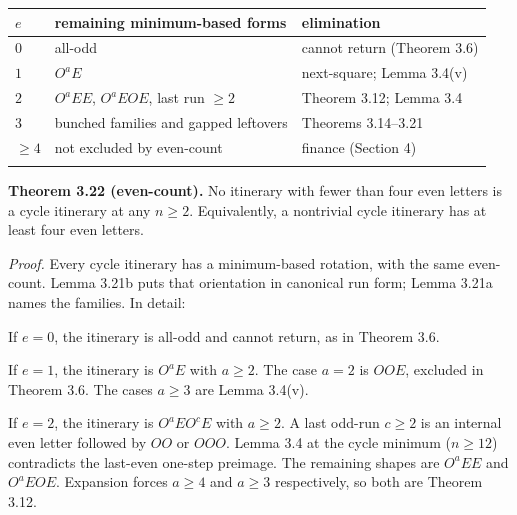 \documentclass[12pt]{article}
\begin{document}
\begin{longtable}[]{@{}
  >{\raggedleft\arraybackslash}p{}
  >{\raggedright\arraybackslash}p{}
  >{\raggedright\arraybackslash}p{}@{}}
\toprule\noalign{}
\begin{minipage}[b]{\linewidth}\raggedleft
\(e\)
\end{minipage} & \begin{minipage}[b]{\linewidth}\raggedright
remaining minimum-based forms
\end{minipage} & \begin{minipage}[b]{\linewidth}\raggedright
elimination
\end{minipage} \\
\midrule\noalign{}
\endhead
\bottomrule\noalign{}
\endfoot
\bottomrule\noalign{}
\endlastfoot
\(0\) & all-odd & cannot return (Theorem 3.6) \\
\(1\) & \(O^aE\) & next-square; Lemma 3.4(v) \\
\(2\) & \(O^aEE\), \(O^aEOE\), last run \(\ge 2\) & Theorem 3.12; Lemma
3.4 \\
\(3\) & bunched families and gapped leftovers & Theorems 3.14--3.21 \\
\(\ge 4\) & not excluded by even-count & finance (Section 4) \\*
\end{longtable}

\endgroup

\textbf{Theorem 3.22 (even-count).} No itinerary with fewer than four
even letters is a cycle itinerary at any \(n\ge 2\). Equivalently, a
nontrivial cycle itinerary has at least four even letters.

\emph{Proof.} Every cycle itinerary has a minimum-based rotation, with
the same even-count. Lemma 3.21b puts that orientation in canonical run
form; Lemma 3.21a names the families. In detail:

If \(e=0\), the itinerary is all-odd and cannot return, as in Theorem
3.6.

If \(e=1\), the itinerary is \(O^aE\) with \(a\ge 2\). The case \(a=2\)
is \(OOE\), excluded in Theorem 3.6. The cases \(a\ge 3\) are Lemma
3.4(v).

If \(e=2\), the itinerary is \(O^aEO^cE\) with \(a\ge 2\). A last
odd-run \(c\ge 2\) is an internal even letter followed by \(OO\) or
\(OOO\). Lemma 3.4 at the cycle minimum (\(n\ge 12\)) contradicts the
last-even one-step preimage. The remaining shapes are \(O^aEE\) and
\(O^aEOE\). Expansion forces \(a\ge 4\) and \(a\ge 3\) respectively, so
both are Theorem 3.12.
\end{document}
